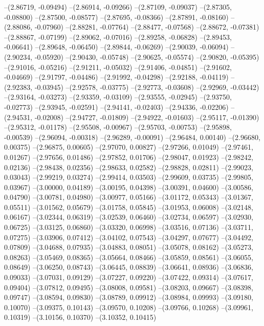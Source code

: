 --(2.86719, -0.09494)
--(2.86914, -0.09266)
--(2.87109, -0.09037)
--(2.87305, -0.08800)
--(2.87500, -0.08577)
--(2.87695, -0.08366)
--(2.87891, -0.08160)
--(2.88086, -0.07960)
--(2.88281, -0.07764)
--(2.88477, -0.07568)
--(2.88672, -0.07381)
--(2.88867, -0.07199)
--(2.89062, -0.07016)
--(2.89258, -0.06828)
--(2.89453, -0.06641)
--(2.89648, -0.06450)
--(2.89844, -0.06269)
--(2.90039, -0.06094)
--(2.90234, -0.05920)
--(2.90430, -0.05748)
--(2.90625, -0.05574)
--(2.90820, -0.05395)
--(2.91016, -0.05216)
--(2.91211, -0.05032)
--(2.91406, -0.04851)
--(2.91602, -0.04669)
--(2.91797, -0.04486)
--(2.91992, -0.04298)
--(2.92188, -0.04119)
--(2.92383, -0.03945)
--(2.92578, -0.03775)
--(2.92773, -0.03608)
--(2.92969, -0.03442)
--(2.93164, -0.03273)
--(2.93359, -0.03109)
--(2.93555, -0.02945)
--(2.93750, -0.02773)
--(2.93945, -0.02591)
--(2.94141, -0.02403)
--(2.94336, -0.02206)
--(2.94531, -0.02008)
--(2.94727, -0.01809)
--(2.94922, -0.01603)
--(2.95117, -0.01390)
--(2.95312, -0.01178)
--(2.95508, -0.00967)
--(2.95703, -0.00753)
--(2.95898, -0.00539)
--(2.96094, -0.00318)
--(2.96289, -0.00091)
--(2.96484, 0.00140)
--(2.96680, 0.00375)
--(2.96875, 0.00605)
--(2.97070, 0.00827)
--(2.97266, 0.01049)
--(2.97461, 0.01267)
--(2.97656, 0.01486)
--(2.97852, 0.01706)
--(2.98047, 0.01923)
--(2.98242, 0.02136)
--(2.98438, 0.02356)
--(2.98633, 0.02582)
--(2.98828, 0.02811)
--(2.99023, 0.03043)
--(2.99219, 0.03274)
--(2.99414, 0.03503)
--(2.99609, 0.03735)
--(2.99805, 0.03967)
--(3.00000, 0.04189)
--(3.00195, 0.04398)
--(3.00391, 0.04600)
--(3.00586, 0.04790)
--(3.00781, 0.04980)
--(3.00977, 0.05166)
--(3.01172, 0.05343)
--(3.01367, 0.05511)
--(3.01562, 0.05679)
--(3.01758, 0.05845)
--(3.01953, 0.06008)
--(3.02148, 0.06167)
--(3.02344, 0.06319)
--(3.02539, 0.06460)
--(3.02734, 0.06597)
--(3.02930, 0.06725)
--(3.03125, 0.06860)
--(3.03320, 0.06998)
--(3.03516, 0.07136)
--(3.03711, 0.07275)
--(3.03906, 0.07412)
--(3.04102, 0.07543)
--(3.04297, 0.07677)
--(3.04492, 0.07809)
--(3.04688, 0.07935)
--(3.04883, 0.08051)
--(3.05078, 0.08162)
--(3.05273, 0.08263)
--(3.05469, 0.08365)
--(3.05664, 0.08466)
--(3.05859, 0.08561)
--(3.06055, 0.08649)
--(3.06250, 0.08743)
--(3.06445, 0.08839)
--(3.06641, 0.08936)
--(3.06836, 0.09033)
--(3.07031, 0.09129)
--(3.07227, 0.09220)
--(3.07422, 0.09314)
--(3.07617, 0.09404)
--(3.07812, 0.09495)
--(3.08008, 0.09581)
--(3.08203, 0.09667)
--(3.08398, 0.09747)
--(3.08594, 0.09830)
--(3.08789, 0.09912)
--(3.08984, 0.09993)
--(3.09180, 0.10070)
--(3.09375, 0.10143)
--(3.09570, 0.10208)
--(3.09766, 0.10268)
--(3.09961, 0.10319)
--(3.10156, 0.10370)
--(3.10352, 0.10415)
